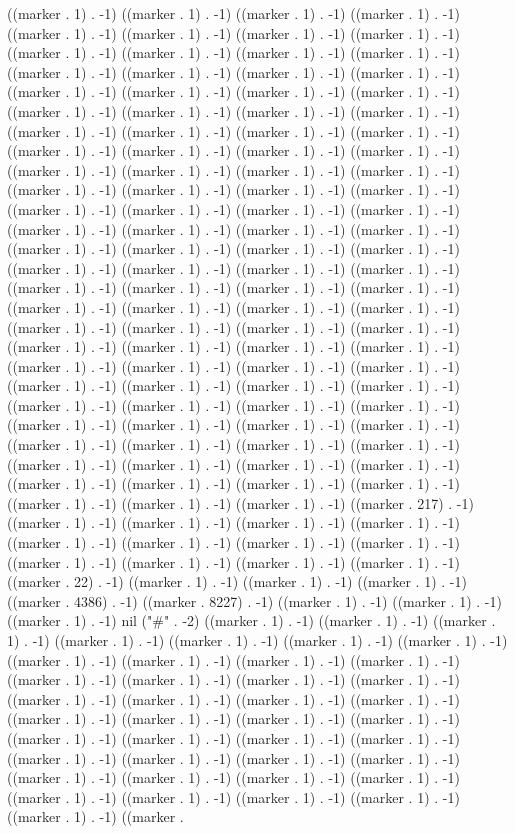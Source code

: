 ((marker . 1) . -1) ((marker . 1) . -1) ((marker . 1) . -1) ((marker . 1) . -1) ((marker . 1) . -1) ((marker . 1) . -1) ((marker . 1) . -1) ((marker . 1) . -1) ((marker . 1) . -1) ((marker . 1) . -1) ((marker . 1) . -1) ((marker . 1) . -1) ((marker . 1) . -1) ((marker . 1) . -1) ((marker . 1) . -1) ((marker . 1) . -1) ((marker . 1) . -1) ((marker . 1) . -1) ((marker . 1) . -1) ((marker . 1) . -1) ((marker . 1) . -1) ((marker . 1) . -1) ((marker . 1) . -1) ((marker . 1) . -1) ((marker . 1) . -1) ((marker . 1) . -1) ((marker . 1) . -1) ((marker . 1) . -1) ((marker . 1) . -1) ((marker . 1) . -1) ((marker . 1) . -1) ((marker . 1) . -1) ((marker . 1) . -1) ((marker . 1) . -1) ((marker . 1) . -1) ((marker . 1) . -1) ((marker . 1) . -1) ((marker . 1) . -1) ((marker . 1) . -1) ((marker . 1) . -1) ((marker . 1) . -1) ((marker . 1) . -1) ((marker . 1) . -1) ((marker . 1) . -1) ((marker . 1) . -1) ((marker . 1) . -1) ((marker . 1) . -1) ((marker . 1) . -1) ((marker . 1) . -1) ((marker . 1) . -1) ((marker . 1) . -1) ((marker . 1) . -1) ((marker . 1) . -1) ((marker . 1) . -1) ((marker . 1) . -1) ((marker . 1) . -1) ((marker . 1) . -1) ((marker . 1) . -1) ((marker . 1) . -1) ((marker . 1) . -1) ((marker . 1) . -1) ((marker . 1) . -1) ((marker . 1) . -1) ((marker . 1) . -1) ((marker . 1) . -1) ((marker . 1) . -1) ((marker . 1) . -1) ((marker . 1) . -1) ((marker . 1) . -1) ((marker . 1) . -1) ((marker . 1) . -1) ((marker . 1) . -1) ((marker . 1) . -1) ((marker . 1) . -1) ((marker . 1) . -1) ((marker . 1) . -1) ((marker . 1) . -1) ((marker . 1) . -1) ((marker . 1) . -1) ((marker . 1) . -1) ((marker . 1) . -1) ((marker . 1) . -1) ((marker . 1) . -1) ((marker . 1) . -1) ((marker . 1) . -1) ((marker . 1) . -1) ((marker . 1) . -1) ((marker . 1) . -1) ((marker . 1) . -1) ((marker . 1) . -1) ((marker . 1) . -1) ((marker . 1) . -1) ((marker . 1) . -1) ((marker . 1) . -1) ((marker . 1) . -1) ((marker . 1) . -1) ((marker . 1) . -1) ((marker . 1) . -1) ((marker . 1) . -1) ((marker . 1) . -1) ((marker . 1) . -1) ((marker . 1) . -1) ((marker . 1) . -1) ((marker . 217) . -1) ((marker . 1) . -1) ((marker . 1) . -1) ((marker . 1) . -1) ((marker . 1) . -1) ((marker . 1) . -1) ((marker . 1) . -1) ((marker . 1) . -1) ((marker . 1) . -1) ((marker . 1) . -1) ((marker . 1) . -1) ((marker . 1) . -1) ((marker . 1) . -1) ((marker . 22) . -1) ((marker . 1) . -1) ((marker . 1) . -1) ((marker . 1) . -1) ((marker . 4386) . -1) ((marker . 8227) . -1) ((marker . 1) . -1) ((marker . 1) . -1) ((marker . 1) . -1) nil ("#" . -2) ((marker . 1) . -1) ((marker . 1) . -1) ((marker . 1) . -1) ((marker . 1) . -1) ((marker . 1) . -1) ((marker . 1) . -1) ((marker . 1) . -1) ((marker . 1) . -1) ((marker . 1) . -1) ((marker . 1) . -1) ((marker . 1) . -1) ((marker . 1) . -1) ((marker . 1) . -1) ((marker . 1) . -1) ((marker . 1) . -1) ((marker . 1) . -1) ((marker . 1) . -1) ((marker . 1) . -1) ((marker . 1) . -1) ((marker . 1) . -1) ((marker . 1) . -1) ((marker . 1) . -1) ((marker . 1) . -1) ((marker . 1) . -1) ((marker . 1) . -1) ((marker . 1) . -1) ((marker . 1) . -1) ((marker . 1) . -1) ((marker . 1) . -1) ((marker . 1) . -1) ((marker . 1) . -1) ((marker . 1) . -1) ((marker . 1) . -1) ((marker . 1) . -1) ((marker . 1) . -1) ((marker . 1) . -1) ((marker . 1) . -1) ((marker . 1) . -1) ((marker . 1) . -1) ((marker . 1) . -1) ((marker . 